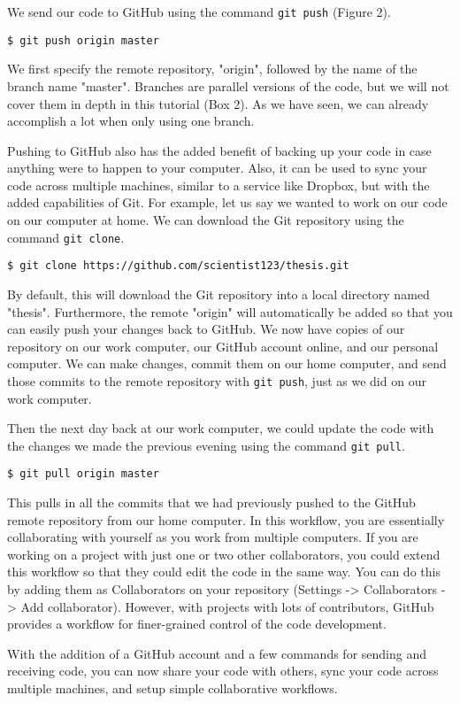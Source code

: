 We send our code to GitHub using the command \verb|git push| (Figure 2).

\begin{lstlisting}
$ git push origin master
\end{lstlisting}

We first specify the remote repository, "origin", followed by the name of the branch name "master".
Branches are parallel versions of the code, but we will not cover them in depth in this tutorial (Box 2).
As we have seen, we can already accomplish a lot when only using one branch.

Pushing to GitHub also has the added benefit of backing up your code in case anything were to happen to your computer.
Also, it can be used to sync your code across multiple machines, similar to a service like Dropbox, but with the added capabilities of Git.
For example, let us say we wanted to work on our code on our computer at home.
We can download the Git repository using the command \verb|git clone|.

\begin{lstlisting}
$ git clone https://github.com/scientist123/thesis.git
\end{lstlisting}

By default, this will download the Git repository into a local directory named "thesis".
Furthermore, the remote "origin" will automatically be added so that you can easily push your changes back to GitHub.
We now have copies of our repository on our work computer, our GitHub account online, and our personal computer.
We can make changes, commit them on our home computer, and send those commits to the remote repository with \verb|git push|, just as we did on our work computer.

Then the next day back at our work computer, we could update the code with the changes we made the previous evening using the command \verb|git pull|.

\begin{lstlisting}
$ git pull origin master
\end{lstlisting}

This pulls in all the commits that we had previously pushed to the GitHub remote repository from our home computer.
In this workflow, you are essentially collaborating with yourself as you work from multiple computers.
If you are working on a project with just one or two other collaborators, you could extend this workflow so that they could edit the code in the same way.
You can do this by adding them as Collaborators on your repository (Settings -> Collaborators -> Add collaborator).
However, with projects with lots of contributors, GitHub provides a workflow for finer-grained control of the code development.

With the addition of a GitHub account and a few commands for sending and receiving code, you can now share your code with others, sync your code across multiple machines, and setup simple collaborative workflows.